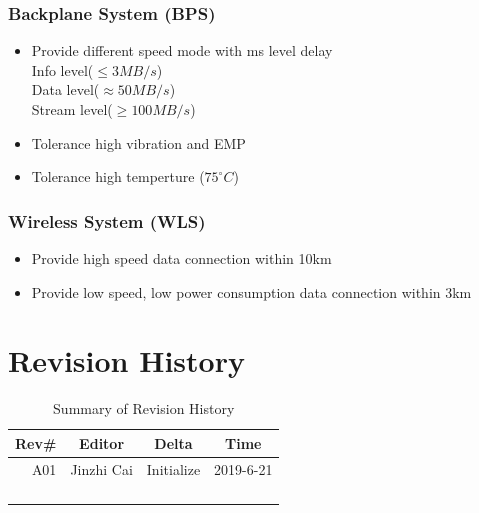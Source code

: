 \documentclass[12pt,article]{memoir}
\begin{document}
\subsection{Backplane System (BPS)}
\begin{itemize}
\item Provide different speed mode with ms level delay \\
Info level($\leq 3MB/s$)\\
Data level($\approx 50MB/s$)\\
Stream level($\geq 100MB/s$)
\item Tolerance high vibration and EMP
\item Tolerance high temperture (\leq $75^{\circ}C$)
\end{itemize}
\subsection{Wireless System (WLS)}
\begin{itemize}
\item Provide high speed data connection within 10km
\item Provide low speed, low power consumption data connection within 3km
\end{itemize}
\chapter{Revision History}
\begin{table}[H]
	\centering
	\begin{tabu}{r || c | c | c }
		Rev\# & Editor & Delta & Time\\ \hline
		A01 & Jinzhi Cai & Initialize  & 2019-6-21 \\
		 & & & \\
		 & & & \\
		 & & & \\
		 & & & \\
	\end{tabu}
	\caption{Summary of Revision History}
	\label{tab:edatools}
\end{table}

\end{document}

